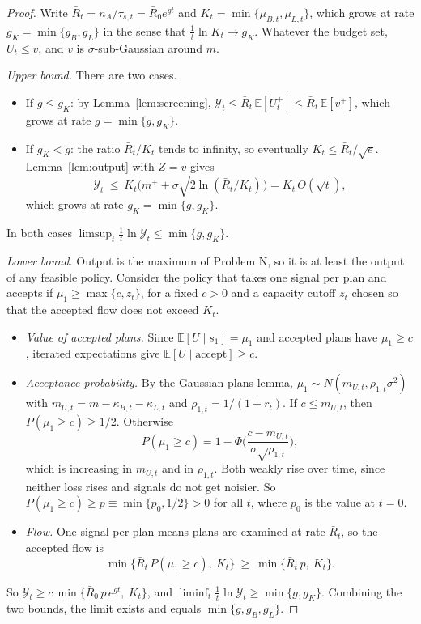 \documentclass[11pt]{article}
\theoremstyle{remark}
\newcommand{\E}{\mathbb{E}}
\newcommand{\Ycal}{\mathcal{Y}}
\newcommand{\accept}{\text{accept}}
\begin{document}
\begin{proof}
Write $\bar R_t=n_A/\tau_{s,t}=\bar R_0e^{gt}$ and $K_t=\min\{\mu_{B,t},\mu_{L,t}\}$, which grows at rate $g_K=\min\{g_B,g_L\}$ in the sense that $\frac1t\ln K_t\to g_K$. Whatever the budget set, $U_t\le v$, and $v$ is $\sigma$-sub-Gaussian around $m$.

\emph{Upper bound.} There are two cases.
\begin{itemize}
  \item If $g\le g_K$: by Lemma~\ref{lem:screening}, $\Ycal_t\le\bar R_t\,\E[U_t^+]\le\bar R_t\,\E[v^+]$, which grows at rate $g=\min\{g,g_K\}$.
  \item If $g_K<g$: the ratio $\bar R_t/K_t$ tends to infinity, so eventually $K_t\le\bar R_t/\sqrt e$. Lemma~\ref{lem:output} with $Z=v$ gives
  \[
  \Ycal_t\ \le\ K_t\Big(m^++\sigma\sqrt{2\ln(\bar R_t/K_t)}\Big)=K_t\,O(\sqrt t),
  \]
  which grows at rate $g_K=\min\{g,g_K\}$.
\end{itemize}
In both cases $\limsup_t\frac1t\ln\Ycal_t\le\min\{g,g_K\}$.

\emph{Lower bound.} Output is the maximum of Problem N, so it is at least the output of any feasible policy. Consider the policy that takes one signal per plan and accepts if $\mu_1\ge\max\{c,z_t\}$, for a fixed $c>0$ and a capacity cutoff $z_t$ chosen so that the accepted flow does not exceed $K_t$.
\begin{itemize}
  \item \emph{Value of accepted plans.} Since $\E[U\mid s_1]=\mu_1$ and accepted plans have $\mu_1\ge c$, iterated expectations give $\E[U\mid\accept]\ge c$.
  \item \emph{Acceptance probability.} By the Gaussian-plans lemma, $\mu_1\sim N(m_{U,t},\rho_{1,t}\sigma^2)$ with $m_{U,t}=m-\kappa_{B,t}-\kappa_{L,t}$ and $\rho_{1,t}=1/(1+r_t)$. If $c\le m_{U,t}$, then $P(\mu_1\ge c)\ge1/2$. Otherwise
  \[
  P(\mu_1\ge c)=1-\Phi\Big(\frac{c-m_{U,t}}{\sigma\sqrt{\rho_{1,t}}}\Big),
  \]
  which is increasing in $m_{U,t}$ and in $\rho_{1,t}$. Both weakly rise over time, since neither loss rises and signals do not get noisier. So $P(\mu_1\ge c)\ge p\equiv\min\{p_0,1/2\}>0$ for all $t$, where $p_0$ is the value at $t=0$.
  \item \emph{Flow.} One signal per plan means plans are examined at rate $\bar R_t$, so the accepted flow is
  \[
  \min\{\bar R_t\,P(\mu_1\ge c),\ K_t\}\ \ge\ \min\{\bar R_t\,p,\ K_t\}.
  \]
\end{itemize}
So $\Ycal_t\ge c\,\min\{\bar R_0\,p\,e^{gt},\ K_t\}$, and $\liminf_t\frac1t\ln\Ycal_t\ge\min\{g,g_K\}$. Combining the two bounds, the limit exists and equals $\min\{g,g_B,g_L\}$.
\end{proof}
\end{document}
